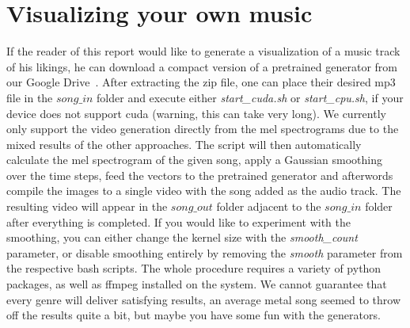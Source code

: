     \section{Visualizing your own music}
    If the reader of this report would like to generate a visualization of a music track of his likings, he can download a compact version of a pretrained generator from our Google Drive~\cite{visualizer}. 
    After extracting the zip file, one can place their desired mp3 file in the $song\_in$ folder and execute either \textit{start\_cuda.sh} or \textit{start\_cpu.sh}, if your device does not support cuda (warning, this can take very long).
    We currently only support the video generation directly from the mel spectrograms due to the mixed results of the other approaches.
    The script will then automatically calculate the mel spectrogram of the given song, apply a Gaussian smoothing over the time steps, feed the vectors to the pretrained generator and afterwords compile the images to a single video with the song added as the audio track.
    The resulting video will appear in the $song\_out$ folder adjacent to the $song\_in$ folder after everything is completed.
    If you would like to experiment with the smoothing, you can either change the kernel size with the \textit{smooth\_count} parameter, or disable smoothing entirely by removing the \textit{smooth} parameter from the respective bash scripts.
    The whole procedure requires a variety of python packages, as well as ffmpeg installed on the system.
    We cannot guarantee that every genre will deliver satisfying results, an average metal song seemed to throw off the results quite a bit, but maybe you have some fun with the generators.